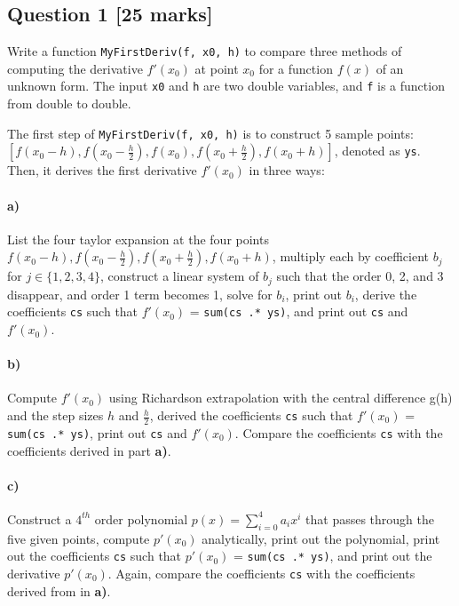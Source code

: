 \documentclass[11pt,a4paper,hidelinks,fleqn]{article}            %
\date{}
\begin{document}
\subsection*{Question 1 [25 marks]} 
Write a function \verb=MyFirstDeriv(f, x0, h)= to compare three methods of computing the derivative $f'(x_0)$
at point $x_0$ for a function $f(x)$ of an unknown form.
The input \verb=x0= and \verb=h= are two double variables,
and \verb=f= is a function from double to double. 

The first step of \verb=MyFirstDeriv(f, x0, h)= is to construct 5 sample points: $[f(x_0-h), f(x_0-\frac{h}{2}), f(x_0), f(x_0+\frac{h}{2}), f(x_0+h)]$, denoted as \verb=ys=.
Then, it derives the first derivative $f'(x_0)$ in three ways:

\vspace{-6mm}
\paragraph{a)} List the four taylor expansion at the four points $f(x_0-h), f(x_0-\frac{h}{2}), f(x_0+\frac{h}{2}), f(x_0+h)$, 
multiply each by coefficient $b_j$ for $j\in\{1, 2, 3, 4\}$, 
construct a linear system of $b_j$ such that the order 0, 2, and 3 disappear, and order 1 term becomes 1, 
solve for $b_i$, 
print out $b_i$,
derive the coefficients \verb=cs= such that $f'(x_0)$ = \verb=sum(cs .* ys)=,
and print out \verb=cs= and $f'(x_0)$. 
\vspace{-6mm}
\paragraph{b)} Compute $f'(x_0)$ using Richardson extrapolation with the central difference g(h) and the step sizes $h$ and $\displaystyle \frac{h}{2}$,
derived the coefficients \verb=cs= such that $f'(x_0)$ = \verb=sum(cs .* ys)=,
print out \verb=cs= and $f'(x_0)$. Compare the coefficients \verb=cs= with the coefficients derived in part \textbf{a)}.
\vspace{-6mm}
\paragraph{c)} Construct a $4^{th}$ order polynomial $p(x) = \sum_{i=0}^4 a_i x^i$ that passes through the five given points, 
compute $p'(x_0)$ analytically, 
print out the polynomial,
print out the coefficients \verb=cs= such that $p'(x_0)$ = \verb=sum(cs .* ys)=,
and print out the derivative $p'(x_0)$.
Again, compare the coefficients \verb=cs= with the coefficients derived from in \textbf{a)}.
\end{document}
